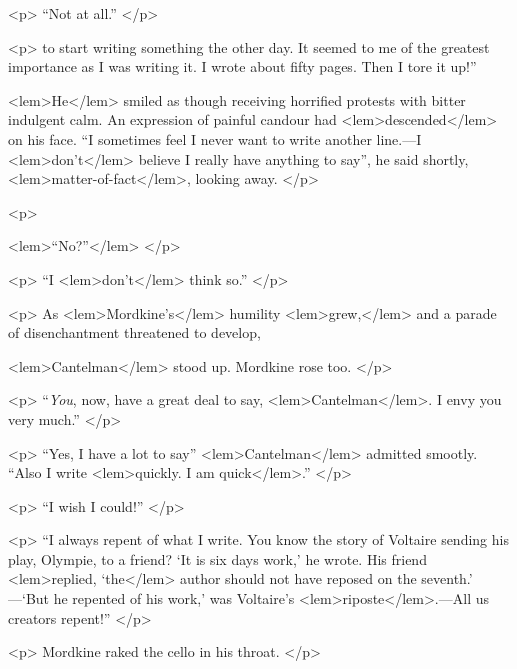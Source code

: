 {{				<p>
				“Not at all.” 
				</p>

				<p>
					{}
				to start writing something the other day. It seemed to me of the greatest 
				importance as I was writing it. I wrote about fifty pages. Then I tore it up!” 
				
<lem>He</lem>
					{} 
				smiled as though receiving horrified protests with bitter indulgent calm. 
				An expression of painful candour had 
<lem>descended</lem>
					{} 
				on his face. “I sometimes feel I 
never want to write another line.---I 
<lem>don't</lem>{} believe I really have anything to say”, 
				he said shortly, 
<lem>matter-of-fact</lem>{}, looking away. 
 				</p> 

				<p>
				
<lem>“No?”</lem>{} 
 				</p> 

				<p>
				“I 
<lem>don't</lem>{} think so.” 
 				</p> 

				<p>
				As 
<lem>Mordkine's</lem>{} humility 
<lem>grew,</lem>
					{} and a parade of disenchantment threatened to develop, 
				
<lem>Cantelman</lem>{} stood up. Mordkine rose too. 
 				</p> 

				<p>
				“\emph{You}, now, have a great deal to say, 
<lem>Cantelman</lem>{}.  I envy you very much.” 
 				</p> 

				<p>
				“Yes, I have a lot to say” 
<lem>Cantelman</lem>{} admitted smootly. “Also I 
				write 
<lem>quickly. I am quick</lem>{}.” 
 				</p> 

				<p>
				“I wish I could!” 
 				</p> 

				<p>
				“I always repent of what I write. You know the story of Voltaire sending his play, 
				Olympie, to a friend? `It is six days work,' he wrote. His friend 
<lem>replied, `the</lem>
					{} 
				author 
				should not have reposed on the seventh.' ---`But he repented of his work,' was 
				Voltaire's 
<lem>riposte</lem>{}.---All us creators repent!” 
 				</p> 

				<p>
				Mordkine raked the cello in his throat. 
 				</p> 

}}
